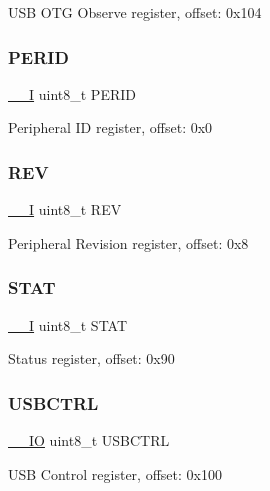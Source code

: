 U\+SB O\+TG Observe register, offset\+: 0x104 \mbox{\label{struct_u_s_b___type_a077edc39b83ba91d23059f34a17d48fb}} 
\subsubsection{\texorpdfstring{PERID}{PERID}}
{\footnotesize\ttfamily \mbox{\hyperlink{core__cm0plus_8h_af63697ed9952cc71e1225efe205f6cd3}{\+\_\+\+\_\+I}} uint8\+\_\+t P\+E\+R\+ID}

Peripheral ID register, offset\+: 0x0 \mbox{\label{struct_u_s_b___type_a9131f08aa5a24b8c9ef95d51f62810de}} 
\subsubsection{\texorpdfstring{REV}{REV}}
{\footnotesize\ttfamily \mbox{\hyperlink{core__cm0plus_8h_af63697ed9952cc71e1225efe205f6cd3}{\+\_\+\+\_\+I}} uint8\+\_\+t R\+EV}

Peripheral Revision register, offset\+: 0x8 \mbox{\label{struct_u_s_b___type_a14ef8aa2216b90fe692d18077ce4b343}} 
\subsubsection{\texorpdfstring{STAT}{STAT}}
{\footnotesize\ttfamily \mbox{\hyperlink{core__cm0plus_8h_af63697ed9952cc71e1225efe205f6cd3}{\+\_\+\+\_\+I}} uint8\+\_\+t S\+T\+AT}

Status register, offset\+: 0x90 \mbox{\label{struct_u_s_b___type_a2fc819f4661814727300843a6c591223}} 
\subsubsection{\texorpdfstring{USBCTRL}{USBCTRL}}
{\footnotesize\ttfamily \mbox{\hyperlink{core__cm0plus_8h_aec43007d9998a0a0e01faede4133d6be}{\+\_\+\+\_\+\+IO}} uint8\+\_\+t U\+S\+B\+C\+T\+RL}

U\+SB Control register, offset\+: 0x100 \mbox{\label{struct_u_s_b___type_ac817eb85b2155f60ef10f06dcb3b3adc}} 
